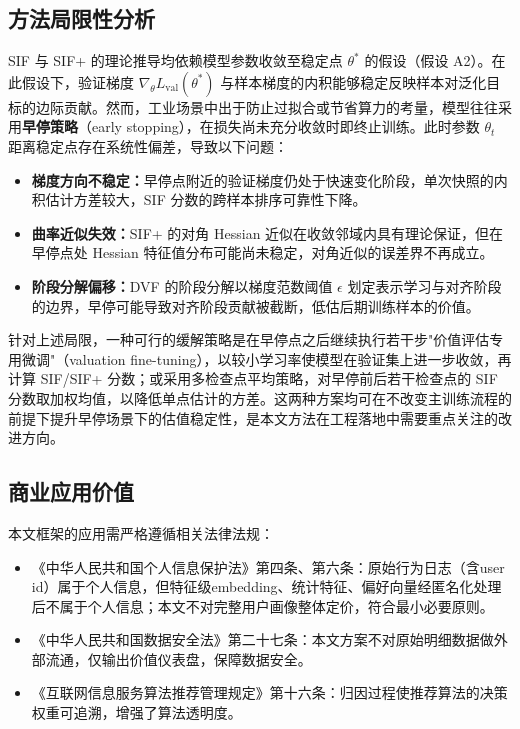 \documentclass[12pt,a4paper]{ctexart}
\theoremstyle{definition}
\theoremstyle{plain}
\begin{document}
\subsection{方法局限性分析}

SIF 与 SIF+ 的理论推导均依赖模型参数收敛至稳定点 $\theta^*$ 的假设（假设 A2）。在此假设下，验证梯度 $\nabla_\theta L_{\mathrm{val}}(\theta^*)$ 与样本梯度的内积能够稳定反映样本对泛化目标的边际贡献。然而，工业场景中出于防止过拟合或节省算力的考量，模型往往采用\textbf{早停策略}（early stopping），在损失尚未充分收敛时即终止训练。此时参数 $\theta_t$ 距离稳定点存在系统性偏差，导致以下问题：

\begin{itemize}
    \item \textbf{梯度方向不稳定：}早停点附近的验证梯度仍处于快速变化阶段，单次快照的内积估计方差较大，SIF 分数的跨样本排序可靠性下降。
    \item \textbf{曲率近似失效：}SIF+ 的对角 Hessian 近似在收敛邻域内具有理论保证，但在早停点处 Hessian 特征值分布可能尚未稳定，对角近似的误差界不再成立。
    \item \textbf{阶段分解偏移：}DVF 的阶段分解以梯度范数阈值 $\epsilon$ 划定表示学习与对齐阶段的边界，早停可能导致对齐阶段贡献被截断，低估后期训练样本的价值。
\end{itemize}

针对上述局限，一种可行的缓解策略是在早停点之后继续执行若干步"价值评估专用微调"（valuation fine-tuning），以较小学习率使模型在验证集上进一步收敛，再计算 SIF/SIF+ 分数；或采用多检查点平均策略，对早停前后若干检查点的 SIF 分数取加权均值，以降低单点估计的方差。这两种方案均可在不改变主训练流程的前提下提升早停场景下的估值稳定性，是本文方法在工程落地中需要重点关注的改进方向。

\subsection{商业应用价值}

本文框架的应用需严格遵循相关法律法规：
\begin{itemize}
    \item 《中华人民共和国个人信息保护法》第四条、第六条：原始行为日志（含user id）属于个人信息，但特征级embedding、统计特征、偏好向量经匿名化处理后不属于个人信息；本文不对完整用户画像整体定价，符合最小必要原则。
    \item 《中华人民共和国数据安全法》第二十七条：本文方案不对原始明细数据做外部流通，仅输出价值仪表盘，保障数据安全。
    \item 《互联网信息服务算法推荐管理规定》第十六条：归因过程使推荐算法的决策权重可追溯，增强了算法透明度。
\end{itemize}
\end{document}
